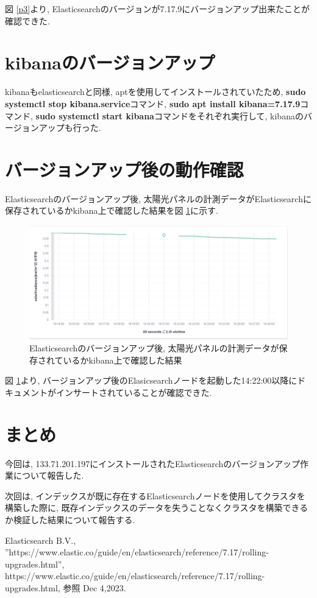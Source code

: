 \documentclass[a4j,12pt,]{jarticle}
\begin{document}
図 \ref{p3}より, Elasticsearchのバージョンが7.17.9にバージョンアップ出来たことが確認できた.

\section{kibanaのバージョンアップ}

kibanaもelasticsearchと同様, aptを使用してインストールされていたため, \textbf{sudo systemctl stop kibana.service}コマンド, \textbf{sudo apt install kibana=7.17.9}コマンド, \textbf{sudo systemctl start kibana}コマンドをそれぞれ実行して, kibanaのバージョンアップも行った.

\section{バージョンアップ後の動作確認}

Elasticsearchのバージョンアップ後, 太陽光パネルの計測データがElasticsearchに保存されているかkibana上で確認した結果を図 \ref{p4}に示す.

\begin{figure}[H]
  \begin{center}
    \includegraphics[width=160mm]{downtime.png}
    \caption{Elasticsearchのバージョンアップ後, 太陽光パネルの計測データが保存されているかkibana上で確認した結果}
    \label{p4}
  \end{center}
\end{figure}

図 \ref{p4}より, バージョンアップ後のElasicsearchノードを起動した14:22:00以降にドキュメントがインサートされていることが確認できた.

\section{まとめ}
今回は, 133.71.201.197にインストールされたElasticsearchのバージョンアップ作業について報告した.

次回は, インデックスが既に存在するElasticsearchノードを使用してクラスタを構築した際に, 既存インデックスのデータを失うことなくクラスタを構築できるか検証した結果について報告する.

\begin{thebibliography}{5}
  Elasticsearch B.V.,\\ ”https://www.elastic.co/guide/en/elasticsearch/reference/7.17/rolling-upgrades.html”, https://www.elastic.co/guide/en/elasticsearch/reference/7.17/rolling-upgrades.html, 参照 Dec 4,2023.
\end{thebibliography}
\end{document}

